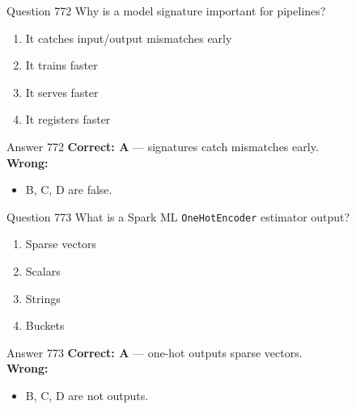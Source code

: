 \documentclass[aspectratio=169,11pt]{beamer}
\begin{document}
	\begin{frame}{Question 772}
		Why is a model signature important for pipelines?
		\begin{enumerate}[label=\Alph*.]
			\item It catches input/output mismatches early
			\item It trains faster
			\item It serves faster
			\item It registers faster
		\end{enumerate}
	\end{frame}
	\begin{frame}{Answer 772}
		\textbf{Correct: A} --- signatures catch mismatches early.\\
		\vspace{0.5em}
		\textbf{Wrong:}
		\begin{itemize}
			\item B, C, D are false.
		\end{itemize}
	\end{frame}
	
	\begin{frame}{Question 773}
		What is a Spark ML \texttt{OneHotEncoder} estimator output?
		\begin{enumerate}[label=\Alph*.]
			\item Sparse vectors
			\item Scalars
			\item Strings
			\item Buckets
		\end{enumerate}
	\end{frame}
	\begin{frame}{Answer 773}
		\textbf{Correct: A} --- one-hot outputs sparse vectors.\\
		\vspace{0.5em}
		\textbf{Wrong:}
		\begin{itemize}
			\item B, C, D are not outputs.
		\end{itemize}
	\end{frame}
	
\end{document}
